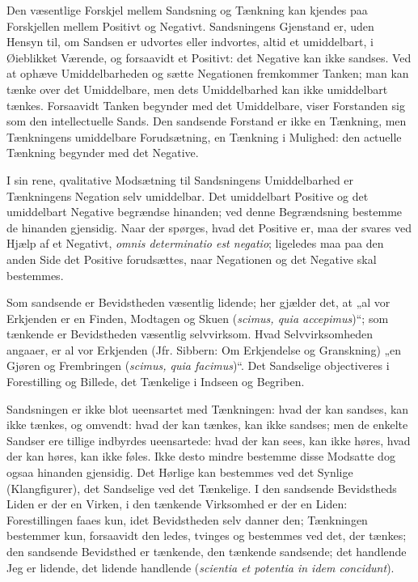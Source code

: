 \documentclass[12pt]{book}
\newcommand{\opage}[1]{\marginnote{\footnotesize\textit{[#1]}}}
\begin{document}
Den væsentlige Forskjel mellem Sandsning og Tænkning kan kjendes paa Forskjellen
mellem Positivt og Negativt. Sandsningens Gjenstand er, uden Hensyn til, om
Sandsen er udvortes eller indvortes, altid et umiddelbart, i Øieblikket Værende,
og forsaavidt et Positivt: det Negative kan ikke sandses. Ved at ophæve
Umiddelbarheden og sætte Negationen fremkommer Tanken; man kan tænke over det
Umiddelbare, men dets Umiddelbarhed kan ikke umiddelbart tænkes. Forsaavidt Tanken
begynder med det Umiddelbare, viser Forstanden sig som den intellectuelle Sands.
Den sandsende Forstand er ikke en Tænkning, men Tænkningens umiddelbare
Forudsætning, en Tænkning i Mulighed: den actuelle Tænkning begynder med det
Negative.

\opage{6} I sin rene, qvalitative Modsætning til Sandsningens Umiddelbarhed er Tænkningens
Negation selv umiddelbar. Det umiddelbart Positive og det umiddelbart Negative
begrændse hinanden; ved denne Begrændsning bestemme de hinanden gjensidig. Naar
der spørges, hvad det Positive er, maa der svares ved Hjælp af et Negativt,
\textit{omnis determinatio est negatio}; ligeledes maa paa den anden Side det
Positive forudsættes, naar Negationen og det Negative skal bestemmes.

Som sandsende er Bevidstheden væsentlig lidende; her gjælder det, at „al vor
Erkjenden er en Finden, Modtagen og Skuen (\textit{scimus, quia accepimus})“; som
tænkende er Bevidstheden væsentlig selvvirksom. Hvad Selvvirksomheden angaaer, er
al vor Erkjenden (Jfr. Sibbern: Om Erkjendelse og Granskning) „en Gjøren og
Frembringen (\textit{scimus, quia facimus})“. Det Sandselige objectiveres i
Forestilling og Billede, det Tænkelige i Indseen og Begriben.

Sandsningen er ikke blot ueensartet med Tænkningen: hvad der kan sandses, kan ikke
tænkes, og omvendt: hvad der kan tænkes, kan ikke sandses; men de enkelte Sandser
ere tillige indbyrdes ueensartede: hvad der kan sees, kan ikke høres, hvad der kan
høres, kan ikke føles. Ikke desto mindre bestemme disse Modsatte dog ogsaa
hinanden gjensidig. Det Hørlige kan bestemmes ved det Synlige (Klangfigurer), det
Sandselige ved det Tænkelige. I den sandsende Bevidstheds Liden er der en Virken,
i den tænkende Virksomhed er der en Liden: Forestillingen faaes kun, idet
Bevidstheden selv danner den; Tænkningen bestemmer kun, forsaavidt den ledes,
tvinges og bestemmes ved det, der tænkes; den sandsende Bevidsthed er tænkende,
den tænkende sandsende; det handlende Jeg er lidende, det lidende handlende
(\textit{scientia et potentia in idem concidunt}).
\end{document}
